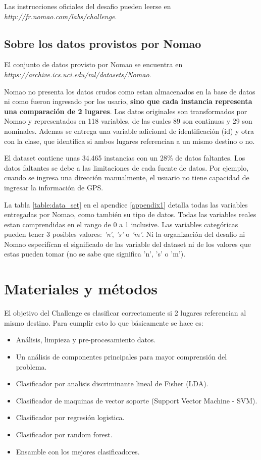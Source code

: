 \documentclass[journal]{IEEEtran}
\begin{document}
Las instrucciones oficiales del desafio pueden leerse en 
\textit{http://fr.nomao.com/labs/challenge}.

\subsection{Sobre los datos provistos por Nomao}

El conjunto de datos provisto por Nomao se encuentra en
\textit{https://archive.ics.uci.edu/ml/datasets/Nomao}. 

Nomao no presenta los datos crudos como estan almacenados en la 
base de datos ni como fueron ingresado por los usario, \textbf{sino que  
cada instancia representa una comparación de 
2 lugares}. Los datos originales son transformados por Nomao y representados
en 118 variables, de las cuales 89 son continuas y 29 son
nominales. Ademas se entrega una variable adicional de identificación (id) y
otra con la clase, que identifica si ambos lugares referencian a un mismo
destino o no. 

El dataset contiene unas 34.465 instancias con un 28\% de datos faltantes.
Los datos faltantes se debe a las limitaciones de cada fuente de datos. Por
ejemplo, cuando se ingresa una dirección manualmente, el usuario no tiene
capacidad de ingresar la información de GPS.

La tabla \ref{table:data_set} en el apendice \ref{appendix1} detalla todas las variables entregadas por 
Nomao, como también su tipo de datos. Todas las variables reales estan comprendidas
en el rango de 0 a 1 inclusive. Las variables
categóricas pueden tener 3 posibles valores: \textit{'n'}, \textit{'s'} 
o \textit{'m'}. Ni la organización del desafio ni Nomao especifícan 
el significado de las variable del dataset ni de los valores
que estas pueden tomar (no se sabe que significa 'n', 's' o 'm').


\section{Materiales y métodos}

El objetivo del Challenge es clasificar correctamente si 2 lugares
referencian al mismo destino. Para cumplir esto lo que básicamente se hace es:
\begin{itemize}
\item Análisis, limpieza y pre-procesamiento datos. 
\item Un análisis de componentes principales para mayor comprensión del problema. 
\item Clasificador por analisis discriminante lineal de Fisher (LDA).
\item Clasificador de maquinas de vector soporte (Support Vector Machine - SVM).
\item Clasificador por regresión logistica.
\item Clasificador por random forest.
\item Ensamble con los mejores clasificadores.
\end{itemize}
\end{document}
